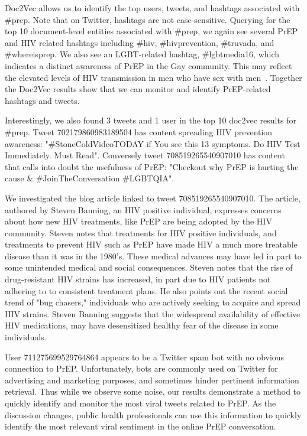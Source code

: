 \documentclass{sig-alternate-05-2015}
\begin{document}
Doc2Vec allows us to identify the top users, tweets, and hashtags associated with \#prep. Note that on Twitter, hashtags are not case-sensitive. Querying for the top 10 document-level entities associated with \#prep, we again see several PrEP and HIV related hashtags including \#hiv, \#hivprevention, \#truvada, and \#whereisprep. We also see an LGBT-related hashtag, \#lgbtmedia16, which indicates a distinct awareness of PrEP in the Gay community. This may reflect the elevated levels of HIV transmission in men who have sex with men~\cite{centers2014hiv}. Together the Doc2Vec results show that we can monitor and identify PrEP-related hashtags and tweets.

Interestingly, we also found 3 tweets and 1 user in the top 10 doc2vec results for \#prep. Tweet 702179860983189504 has content spreading HIV prevention awareness: "\#StoneColdVideoTODAY if You see this 13 symptoms. Do HIV Test Immediately. Must Read". Conversely tweet 708519265540907010 has content that calls into doubt the usefulness of PrEP: "Checkout why PrEP is hurting the cause \& \#JoinTheConversation \#LGBTQIA".

We investigated the blog article linked to tweet 708519265540907010\cite{prephurtingcause}. The article, authored by Steven Banning, an HIV positive individual, expresses concerns about how new HIV treatments, like PrEP are being adopted by the HIV community. Steven notes that treatments for HIV positive individuals, and treatments to prevent HIV such as PrEP have made HIV a much more treatable disease than it was in the 1980's. These medical advances may have led in part to some unintended medical and social consequences. Steven notes that the rise of drug-resistant HIV strains has increased, in part due to HIV patients not adhering to to consistent treatment plans. He also points out the recent social trend of "bug chasers," individuals who are actively seeking to acquire and spread HIV strains. Steven Banning suggests that the widespread availability of effective HIV medications, may have desensitized healthy fear of the disease in some individuals.

User 711275699529764864 appears to be a Twitter spam bot with no obvious connection to PrEP. Unfortunately, bots are commonly used on Twitter for advertising and marketing purposes, and sometimes hinder pertinent information retrieval. Thus while we observe some noise, our results demonstrate a method to quickly identify and monitor the most viral tweets related to PrEP. As the discussion changes, public health professionals can use this information to quickly identify the most relevant viral sentiment in the online PrEP conversation.
\end{document}
